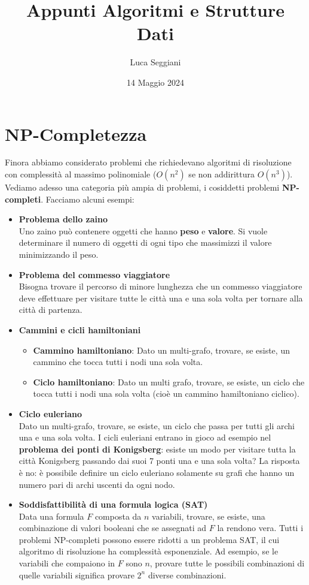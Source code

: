 \documentclass[a4paper,12pt]{article}
\title{Appunti Algoritmi e Strutture Dati}
\author{Luca Seggiani}
\date{14 Maggio 2024}
\begin{document}
\maketitle
\section{NP-Completezza}
Finora abbiamo considerato problemi che richiedevano algoritmi di risoluzione con complessità al massimo polinomiale
($O(n^2)$ se non addirittura $O(n^3)$). Vediamo adesso una categoria più ampia di problemi, i cosiddetti problemi \textbf{NP-completi}.
Facciamo alcuni esempi: 
\begin{itemize}
  \item \textbf{Problema dello zaino} \\
Uno zaino può contenere oggetti che hanno \textbf{peso} e \textbf{valore}. Si vuole determinare il numero di oggetti di ogni 
tipo che massimizzi il valore minimizzando il peso.
  \item \textbf{Problema del commesso viaggiatore} \\
    Bisogna trovare il percorso di minore lunghezza che un commesso viaggiatore deve effettuare per visitare tutte le città una e una sola
    volta per tornare alla città di partenza.
  \item \textbf{Cammini e cicli hamiltoniani}
    \begin{itemize}
      \item \textbf{Cammino hamiltoniano}: Dato un multi-grafo, trovare, se esiste, un cammino che tocca tutti i nodi una sola volta.
      \item \textbf{Ciclo hamiltoniano}: Dato un multi grafo, trovare, se esiste, un ciclo che tocca tutti i nodi una sola volta (cioè
        un cammino hamiltoniano ciclico).
    \end{itemize}
  \item \textbf{Ciclo euleriano} \\
    Dato un multi-grafo, trovare, se esiste, un ciclo che passa per tutti gli archi una e una sola volta. I cicli euleriani
    entrano in gioco ad esempio nel \textbf{problema dei ponti di Konigsberg}: esiste un modo per visitare tutta la città Konigsberg passando dai
    suoi 7 ponti una e una sola volta? La risposta è no: è possibile definire un ciclo euleriano solamente su grafi che hanno un numero pari di archi uscenti da ogni nodo.
  \item \textbf{Soddisfattibilità di una formula logica (SAT)} \\
    Data una formula $F$ composta da $n$ variabili, trovare, se esiste, una combinazione di valori booleani che se assegnati ad $F$ la rendono vera. Tutti i problemi
    NP-completi possono essere ridotti a un problema SAT, il cui algoritmo di risoluzione ha complessità esponenziale. Ad esempio, se le variabili che compaiono in $F$ sono $n$,
    provare tutte le possibili combinazioni di quelle variabili significa provare $2^n$ diverse combinazioni.
\end{itemize}
\end{document}
